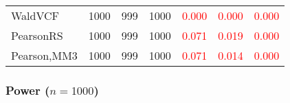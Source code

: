 \documentclass[
]{article}
\begin{document}
\begin{table}[H]
{\begin{tabular}[t]{lrrrrrr}
\hspace{1em}WaldVCF & 1000 & 999 & 1000 & \textcolor{red}{0.000} & \textcolor{red}{0.000} & \textcolor{red}{0.000}\\
\hspace{1em}PearsonRS & 1000 & 999 & 1000 & \textcolor{red}{0.071} & \textcolor{red}{0.019} & \textcolor{red}{0.000}\\
\hspace{1em}Pearson,MM3 & 1000 & 999 & 1000 & \textcolor{red}{0.071} & \textcolor{red}{0.014} & \textcolor{red}{0.000}\\
\bottomrule
\end{tabular}}
\endgroup{}
\end{table}

\hypertarget{power-n1000-2}{%
\subsubsection{\texorpdfstring{Power
(\(n=1000\))}{Power (n=1000)}}\label{power-n1000-2}}
\end{document}
